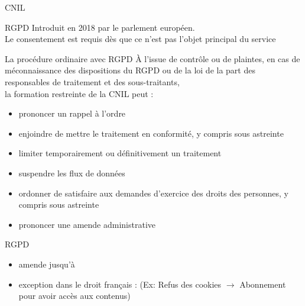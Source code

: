 \begin{frame}{CNIL}
\end{frame}

\begin{frame}{RGPD}
  Introduit en 2018 par le parlement européen.\\
  Le consentement est requis dès que ce n’est pas l’objet principal du service \\
\end{frame}

\begin{frame}{La procédure ordinaire avec RGPD}
  À l’issue de contrôle ou de plaintes, 
  en cas de méconnaissance des dispositions du RGPD ou de la loi de la part 
  des responsables de traitement et des sous-traitants, \\
  la formation restreinte de la CNIL  peut :
  \begin{itemize}
    \item prononcer un rappel à l’ordre
    \item enjoindre de mettre le traitement en conformité, y compris sous astreinte
    \item limiter temporairement ou définitivement un traitement
    \item suspendre les flux de données
    \item ordonner de satisfaire aux demandes d’exercice des droits des personnes, 
          y compris sous astreinte
    \item prononcer une amende administrative
  \end{itemize}
\end{frame}

\begin{frame}{RGPD}
  \begin{itemize}
    \item amende jusqu’à 
    \item exception dans le droit français :  (Ex: Refus des cookies $\rightarrow$ Abonnement pour avoir accès aux contenus)\\
  \end{itemize}
\end{frame}

